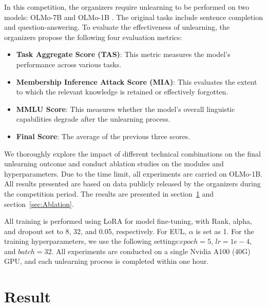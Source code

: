 \documentclass[11pt]{article}
\begin{document}


In this competition, the organizers require unlearning to be performed on two models: OLMo-7B and OLMo-1B \cite{groeneveld2024olmo}. The original tasks include sentence completion and question-answering. To evaluate the effectiveness of unlearning, the organizers propose the following four evaluation metrics:
\begin{itemize}
	\item \textbf{Task Aggregate Score (TAS)}: This metric measures the model's performance across various tasks.
	\item \textbf{Membership Inference Attack Score (MIA)}: This evaluates the extent to which the relevant knowledge is retained or effectively forgotten.
	\item \textbf{MMLU Score}: This measures whether the model's overall linguistic capabilities degrade after the unlearning process.
	\item \textbf{Final Score}: The average of the previous three scores.
\end{itemize}


We thoroughly explore the impact of different technical combinations on the final unlearning outcome and conduct ablation studies on the modules and hyperparameters. Due to the time limit, all experiments are carried on OLMo-1B. All results presented are based on data publicly released by the organizers during the competition period. The results are presented in section~\ref{sec:Result} and section~\ref{sec:Ablation}.

All training is performed using LoRA \cite{hu2022lora} for model fine-tuning, with Rank, alpha, and dropout set to 8, 32, and 0.05, respectively. 
For EUL, $\alpha$ is set as 1. For the training hyperparameters, we use the following settings:$epoch=5$, $lr=1e-4$, and $batch=32$. All experiments are conducted on a single Nvidia A100 (40G) GPU, and each unlearning process is completed within one hour.

\section{Result}
\label{sec:Result}
\end{document}
